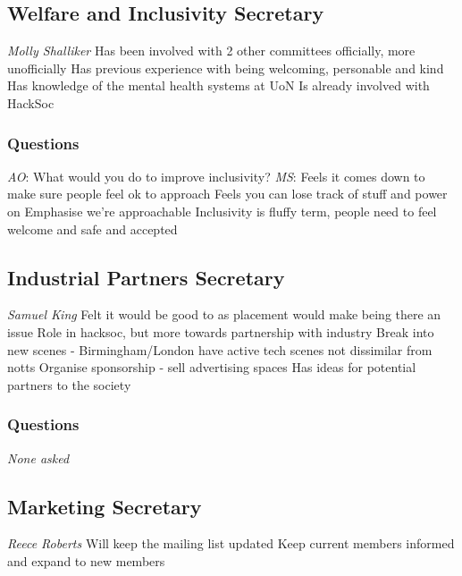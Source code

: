 \documentclass[11pt]{meetingmins}
\begin{document}
\subsection{Welfare and Inclusivity Secretary}
\begin{items}
	\item
	\textit{Molly Shalliker}
		\subitem
		Has been involved with 2 other committees officially, more unofficially
		\subitem
		Has previous experience with being welcoming, personable and kind
		\subitem
		Has knowledge of the mental health systems at UoN
		\subitem
		Is already involved with HackSoc	
\end{items}

\subsubsection{Questions}
\begin{items}
	\item
	\textit{AO}: What would you do to improve inclusivity?
		\subitem
		\textit{MS}:
			\subsubitem
			Feels it comes down to make sure people feel ok to approach
			\subsubitem
			Feels you can lose track of stuff and power on
			\subsubitem
			Emphasise we're approachable
			\subsubitem
			Inclusivity is fluffy term, people need to feel welcome and safe and accepted
\end{items}


\subsection{Industrial Partners Secretary}
\begin{items}
	\item
	\textit{Samuel King}
		\subitem
		Felt it would be good to as placement would make being there an issue
		\subitem
		Role in hacksoc, but more towards partnership with industry
		\subitem
		Break into new scenes - Birmingham/London have active tech scenes not dissimilar from notts
		\subitem
		Organise sponsorship - sell advertising spaces
		\subitem
		Has ideas for potential partners to the society
\end{items}

\subsubsection{Questions}
\textit{None asked}

\subsection{Marketing Secretary}
\begin{items}
	\item
	\textit{Reece Roberts}
		\subitem
		Will keep the mailing list updated
		\subitem
		Keep current members informed and expand to new members
\end{items}
\end{document}
